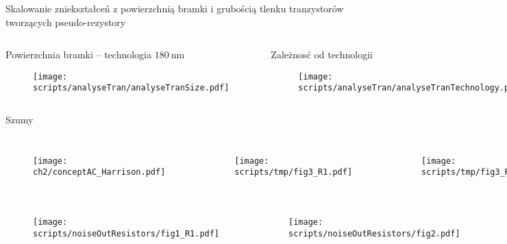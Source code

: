 \begin{frame}{Skalowanie zniekształceń z powierzchnią bramki i grubością tlenku tranzystorów tworzących pseudo-rezystory}
    \begin{columns}
        \begin{block}{Powierzchnia bramki -- technologia $\SI{180}{\nano\metre}$ }
            \begin{figure}[H]
                \centering
                \texttt{[image: scripts/analyseTran/analyseTranSize.pdf]}
            \end{figure}
        \end{block}

        \begin{block}{Zależnosć od technologii}
            \begin{figure}[H]
                \centering
                \texttt{[image: scripts/analyseTran/analyseTranTechnology.pdf]}
            \end{figure}
        \end{block}


    \end{columns}

\end{frame}

\begin{frame}{Szumy}
    \vspace{-5mm} %

    \begin{columns}
    \begin{figure}[H]
        \centering
        \texttt{[image: ch2/conceptAC\_Harrison.pdf]} 
    \end{figure}
        \begin{figure}[H]
            \centering
            \texttt{[image: scripts/tmp/fig3\_R1.pdf]}
        \end{figure}
        \begin{figure}[H]
            \centering
            \texttt{[image: scripts/tmp/fig3\_R2.pdf]}
        \end{figure}
    \end{columns}

    \vspace{-5mm} %


    \begin{columns}
        \begin{figure}[H]
            \centering
            \texttt{[image: scripts/noiseOutResistors/fig1\_R1.pdf]}
        \end{figure}
        \begin{figure}[H]
            \centering
            \texttt{[image: scripts/noiseOutResistors/fig2.pdf]}
        \end{figure}
    \end{columns}


\end{frame}


